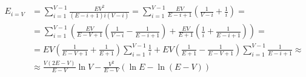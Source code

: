 \documentclass{llncs}
\begin{document}
  \begin{align*}
   E_{i=V} & = \sum_{i = 1}^{V - 1} \frac{EV^2}{(E - i + 1)i(V - i)} = \sum_{i = 1}^{V - 1} \frac{EV}{E - i  + 1} \left( \frac{1}{V - i} + \frac{1}{i}\right) = \\
	  & = \sum_{i = 1}^{V - 1} \left( \frac{EV}{E - V + 1} \left( \frac{1}{V - i} - \frac{1}{E - i + 1} \right) + \frac{EV}{E + 1} \left( \frac{1}{i} + \frac{1}{E - i + 1} \right) \right) = \\
	  & = EV \left( \frac{1}{E - V + 1} + \frac{1}{E + 1} \right) \sum_{i = 1}^{V - 1} \frac{1}{i} + EV \left( \frac{1}{E + 1} - \frac{1}{E - V + 1} \right) \sum_{i = 1}^{V - 1} \frac{1}{E - i + 1} \approx \\
	  & \approx \frac{V(2E - V)}{E - V} \ln{V} - \frac{V^2}{E - V} (\ln{E} - \ln{(E - V)} )
  \end{align*}

 
 
\end{document}
